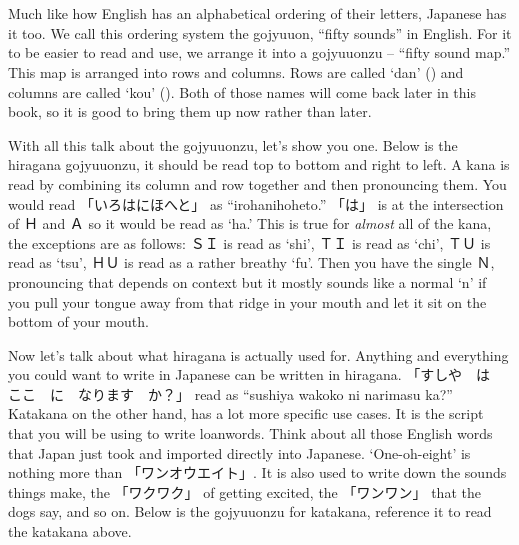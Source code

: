 \section[五十音図]{}\label{sec:PR仮名五十音図}

Much like how English has an alphabetical ordering of their letters, Japanese has it too. We call this ordering system the gojyuuon, ``fifty sounds'' in English. For it to be easier to read and use, we arrange it into a gojyuuonzu -- ``fifty sound map.'' This map is arranged into rows and columns. Rows are called `dan' () and columns are called `kou' (). Both of those names will come back later in this book, so it is good to bring them up now rather than later.

With all this talk about the gojyuuonzu, let's show you one. Below is the hiragana gojyuuonzu, it should be read top to bottom and right to left. A kana is read by combining its column and row together and then pronouncing them. You would read 「いろはにほへと」 as ``irohanihoheto.'' 「は」 is at the intersection of Ｈ and Ａ so it would be read as `ha.' This is true for \textit{almost} all of the kana, the exceptions are as follows: ＳＩ is read as `shi', ＴＩ is read as `chi', ＴＵ is read as `tsu', ＨＵ is read as a rather breathy `fu'. Then you have the single Ｎ, pronouncing that depends on context but it mostly sounds like a normal `n' if you pull your tongue away from that ridge in your mouth and let it sit on the bottom of your mouth. 



Now let's talk about what hiragana is actually used for. Anything and everything you could want to write in Japanese can be written in hiragana. 「すしや　は　ここ　に　なります　か？」 read as ``sushiya wa\footnotemark koko ni narimasu ka?'' Katakana on the other hand, has a lot more specific use cases. It is the script that you will be using to write loanwords. Think about all those English words that Japan just took and imported directly into Japanese. `One-oh-eight' is nothing more than 「ワンオウエイト」. It is also used to write down the sounds things make, the 「ワクワク」 of getting excited, the 「ワンワン」 that the dogs say, and so on. Below is the gojyuuonzu for katakana, reference it to read the katakana above.


